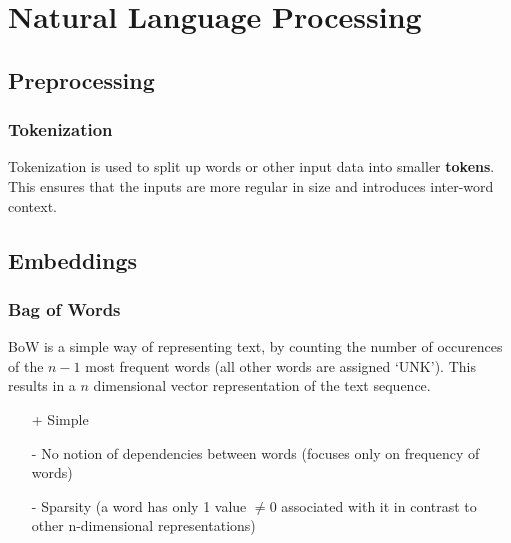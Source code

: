 \section{Natural Language Processing}
\subsection{Preprocessing}
\subsubsection{Tokenization}
Tokenization is used to split up words or other input data into smaller \textbf{tokens}. This ensures that the inputs are more regular in size and introduces inter-word context.

\subsection{Embeddings}

\subsubsection{Bag of Words}
BoW is a simple way of representing text, by counting the number of occurences of the $n-1$ most frequent words (all other words are assigned `UNK').
This results in a $n$ dimensional vector representation of the text sequence.
\begin{itemize}
    \item [+] Simple
    \item [-] No notion of dependencies between words (focuses only on frequency of words)
    \item [-] Sparsity (a word has only 1 value $\neq 0$ associated with it in contrast to other n-dimensional representations)
\end{itemize}
